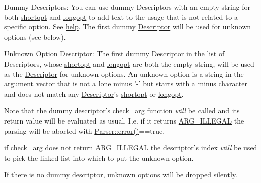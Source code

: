 \begin{DoxyParagraph}{Dummy Descriptors\-:}
You can use dummy Descriptors with an empty string for both \hyperlink{struct_option_parser_1_1_descriptor_a21415d74531b006e9a7a06ccadbd2721}{shortopt} and \hyperlink{struct_option_parser_1_1_descriptor_ab9db8207bae68dd5c4ee83e05189a9d0}{longopt} to add text to the usage that is not related to a specific option. See \hyperlink{struct_option_parser_1_1_descriptor_ad281343957d1b5c1d617306479788f13}{help}. The first dummy \hyperlink{struct_option_parser_1_1_descriptor}{Descriptor} will be used for unknown options (see below).
\end{DoxyParagraph}
\begin{DoxyParagraph}{Unknown Option Descriptor\-:}
The first dummy \hyperlink{struct_option_parser_1_1_descriptor}{Descriptor} in the list of Descriptors, whose \hyperlink{struct_option_parser_1_1_descriptor_a21415d74531b006e9a7a06ccadbd2721}{shortopt} and \hyperlink{struct_option_parser_1_1_descriptor_ab9db8207bae68dd5c4ee83e05189a9d0}{longopt} are both the empty string, will be used as the \hyperlink{struct_option_parser_1_1_descriptor}{Descriptor} for unknown options. An unknown option is a string in the argument vector that is not a lone minus {\ttfamily '-\/'} but starts with a minus character and does not match any \hyperlink{struct_option_parser_1_1_descriptor}{Descriptor}'s \hyperlink{struct_option_parser_1_1_descriptor_a21415d74531b006e9a7a06ccadbd2721}{shortopt} or \hyperlink{struct_option_parser_1_1_descriptor_ab9db8207bae68dd5c4ee83e05189a9d0}{longopt}. \par
 Note that the dummy descriptor's \hyperlink{struct_option_parser_1_1_descriptor_aac19c7bd3a84282211edd0331c92a44a}{check\-\_\-arg} function {\itshape will} be called and its return value will be evaluated as usual. I.\-e. if it returns \hyperlink{namespace_option_parser_ad237d47d58c66dea8dcf4f53ac11a6e4a6ea016ff6334ed0d2ec885e96a76c472}{A\-R\-G\-\_\-\-I\-L\-L\-E\-G\-A\-L} the parsing will be aborted with {\ttfamily \hyperlink{class_option_parser_1_1_parser_aef1c498ad8015851c84d269640076c5b}{Parser\-::error()}==true}. \par
 if {\ttfamily check\-\_\-arg} does not return \hyperlink{namespace_option_parser_ad237d47d58c66dea8dcf4f53ac11a6e4a6ea016ff6334ed0d2ec885e96a76c472}{A\-R\-G\-\_\-\-I\-L\-L\-E\-G\-A\-L} the descriptor's \hyperlink{struct_option_parser_1_1_descriptor_ae62860781844b44c0bd4f730c96701d7}{index} {\itshape will} be used to pick the linked list into which to put the unknown option. \par
 If there is no dummy descriptor, unknown options will be dropped silently. 
\end{DoxyParagraph}


